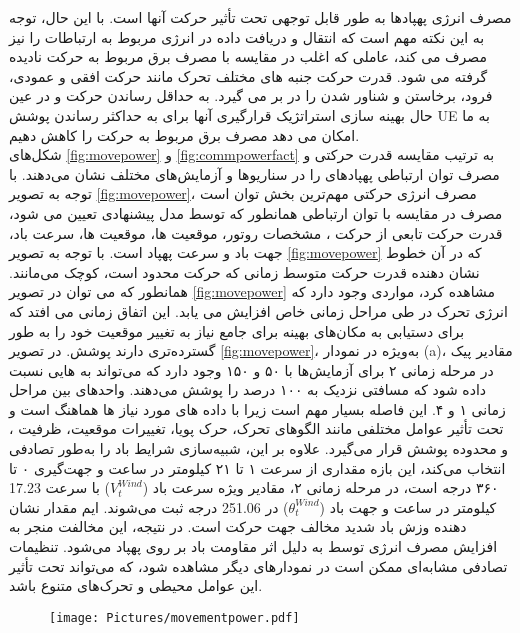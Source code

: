 \begin{itemize}
{	مصرف انرژی پهپادها به طور قابل توجهی تحت تأثیر حرکت آنها است. با این حال، توجه به این نکته مهم است که انتقال و دریافت داده در  انرژی مربوط به ارتباطات را نیز مصرف می کند، عاملی که اغلب در مقایسه با مصرف برق مربوط به حرکت نادیده گرفته می شود. قدرت حرکت جنبه های مختلف تحرک مانند حرکت افقی و عمودی، فرود، برخاستن و شناور شدن را در بر می گیرد. به حداقل رساندن حرکت  و در عین حال بهینه سازی استراتژیک قرارگیری آنها برای به حداکثر رساندن پوشش UE به ما امکان می دهد مصرف برق مربوط به حرکت را کاهش دهیم.
	\\
	شکل‌های  \ref{fig:movepower} و \ref{fig:commpowerfact} به ترتیب مقایسه قدرت حرکتی و مصرف توان ارتباطی پهپادهای  را در سناریوها و آزمایش‌های مختلف نشان می‌دهند.
	با توجه به تصویر \ref{fig:movepower}، مصرف انرژی حرکتی مهم‌ترین بخش توان است مصرف در مقایسه با توان ارتباطی همانطور که توسط مدل پیشنهادی تعیین می شود، قدرت حرکت تابعی از حرکت ، مشخصات روتور، موقعیت‌ ها، موقعیت ها، سرعت باد، جهت باد و سرعت پهپاد است. با توجه به تصویر \ref{fig:movepower} که در آن خطوط نشان دهنده قدرت حرکت متوسط ​​زمانی که حرکت  محدود است، کوچک می‌مانند.
	همانطور که می توان در تصویر \ref{fig:movepower} مشاهده کرد، مواردی وجود دارد که انرژی تحرک در طی مراحل زمانی خاص افزایش می یابد. این اتفاق زمانی می افتد که  برای دستیابی به مکان‌های بهینه برای  جامع نیاز به تغییر موقعیت خود را به طور گسترده‌تری دارند پوشش.
	در تصویر \ref{fig:movepower}، به‌ویژه در نمودار (a)، مقادیر پیک در مرحله زمانی ۲ برای آزمایش‌ها با ۵۰ و ۱۵۰  وجود دارد که می‌تواند به ‌هایی نسبت داده شود که مسافتی نزدیک به ۱۰۰ درصد را پوشش می‌دهند. واحدهای بین مراحل زمانی ۱ و ۴. این فاصله بسیار مهم است زیرا با داده های مورد نیاز ها هماهنگ است و تحت تأثیر عوامل مختلفی مانند الگوهای تحرک، حرک پویا، تغییرات موقعیت، ظرفیت ، و محدوده پوشش قرار می‌گیرد. علاوه بر این، شبیه‌سازی شرایط باد را به‌طور تصادفی انتخاب می‌کند، این بازه مقداری از سرعت ۱ تا ۲۱ کیلومتر در ساعت و جهت‌گیری ۰ تا ۳۶۰ درجه است، در مرحله زمانی ۲، مقادیر ویژه سرعت باد ($V_{t}^{Wind}$) با سرعت 17.23 کیلومتر در ساعت و جهت باد ($\theta_{t}^{Wind}$) در 251.06 درجه ثبت می‌شوند. ایم مقدار نشان دهنده وزش باد شدید مخالف جهت حرکت  است. در نتیجه، این مخالفت منجر به افزایش مصرف انرژی توسط  به دلیل اثر مقاومت باد  بر روی پهپاد می‌شود. تنظیمات تصادفی مشابه‌ای ممکن است در نمودارهای دیگر مشاهده شود، که می‌تواند تحت تأثیر این عوامل محیطی و تحرک‌های متنوع باشد.
\\	
	\begin{figure}%
		\centering
		\texttt{[image: Pictures/movementpower.pdf]}

\end{figure}}
\end{itemize}
